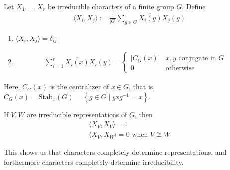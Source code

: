 \documentclass{memoir}
\begin{document}
Let \(X_1,\ldots,X_r\) be irreducible characters of a finite group \(G\). Define
\begin{align*}
	\langle X_i, X_j \rangle := \frac{1}{\left| G \right| } \sum_{g \in G} \overline{X_i(g)}X_j(g)
\end{align*}

\begin{thm}
	\begin{enumerate}
		\item \(\langle X_i, X_j \rangle = \delta _{ij}\) 
		\item 
			\begin{align*}
				\sum_{i=1}^{r} \overline{X_i(x)}X_i(y) = \begin{cases}
					\left| C_G(x) \right| & x,y \text{ conjugate in }G\\
					0 & \text{otherwise}
				\end{cases}
			\end{align*}
	\end{enumerate}
\end{thm}
			Here, \(C_G(x)\) is the centralizer of \(x \in G\), that is, \(C_G(x) = \textrm{Stab}_x(G) = \left\{g \in G \mid g x g^{-1} = x \right\} \).


\begin{thm}
	If \(V,W\) are irreducible representations of \(G\), then
	\begin{align*}
		\langle X_V,X_V \rangle = 1\\
		\langle X_V,X_W \rangle = 0 \text{ when }V\not\cong W
	\end{align*}
\end{thm}
This shows us that characters completely determine representations, and forthermore characters completely determine irreducibility.
\end{document}
